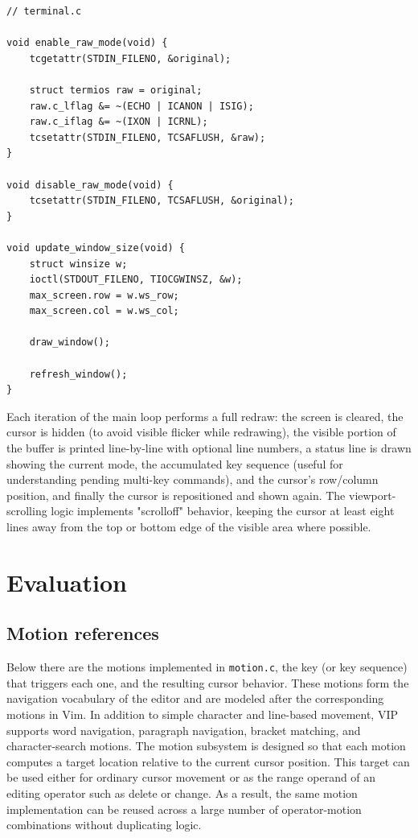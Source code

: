 \documentclass[journal]{IEEEtran}
\begin{document}
\begin{verbatim}
// terminal.c

void enable_raw_mode(void) {
    tcgetattr(STDIN_FILENO, &original);

    struct termios raw = original;
    raw.c_lflag &= ~(ECHO | ICANON | ISIG);
    raw.c_iflag &= ~(IXON | ICRNL);
    tcsetattr(STDIN_FILENO, TCSAFLUSH, &raw);
}

void disable_raw_mode(void) {
    tcsetattr(STDIN_FILENO, TCSAFLUSH, &original);
}

void update_window_size(void) {
    struct winsize w;
    ioctl(STDOUT_FILENO, TIOCGWINSZ, &w);
    max_screen.row = w.ws_row;
    max_screen.col = w.ws_col;

    draw_window();

    refresh_window();
}
\end{verbatim}

Each iteration of the main loop performs a full redraw: the screen is cleared, the cursor is hidden (to avoid visible flicker while redrawing), the visible portion of the buffer is printed line-by-line with optional line numbers, a status line is drawn showing the current mode, the accumulated key sequence (useful for understanding pending multi-key commands), and the cursor's row/column position, and finally the cursor is repositioned and shown again. The viewport-scrolling logic implements "scrolloff" behavior, keeping the cursor at least eight lines away from the top or bottom edge of the visible area where possible.

\section{Evaluation}

\subsection{Motion references}
Below there are the motions implemented in \texttt{motion.c}, the key (or key sequence) that triggers each one, and the resulting cursor behavior. These motions form the navigation vocabulary of the editor and are modeled after the corresponding motions in Vim. In addition to simple character and line-based movement, VIP supports word navigation, paragraph navigation, bracket matching, and character-search motions. The motion subsystem is designed so that each motion computes a target location relative to the current cursor position. This target can be used either for ordinary cursor movement or as the range operand of an editing operator such as delete or change. As a result, the same motion implementation can be reused across a large number of operator-motion combinations without duplicating logic.
\end{document}
